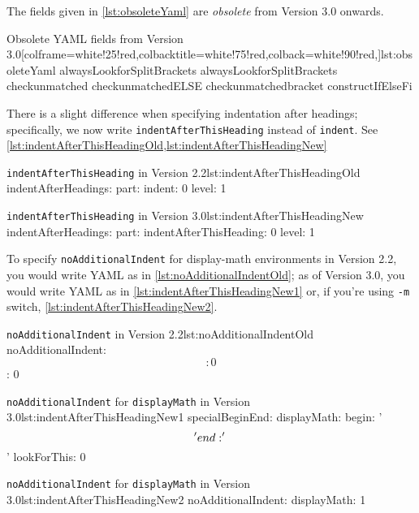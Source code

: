 	 The fields given in \cref{lst:obsoleteYaml} are \emph{obsolete} from Version 3.0
	 onwards.
	 \begin{yaml}[style=yaml-LST,numbers=none]{Obsolete YAML fields from Version 3.0}[colframe=white!25!red,colbacktitle=white!75!red,colback=white!90!red,]{lst:obsoleteYaml}
alwaysLookforSplitBrackets
alwaysLookforSplitBrackets
checkunmatched
checkunmatchedELSE
checkunmatchedbracket
constructIfElseFi
\end{yaml}

	 There is a slight difference when specifying indentation after headings; specifically,
	 we now write \texttt{indentAfterThisHeading} instead of \texttt{indent}. See \cref{lst:indentAfterThisHeadingOld,lst:indentAfterThisHeadingNew}

	 \begin{minipage}{.45\textwidth}
		 \begin{yaml}[style=yaml-LST,numbers=none]{\texttt{indentAfterThisHeading} in Version 2.2}{lst:indentAfterThisHeadingOld}
indentAfterHeadings:
    part:
       indent: 0
       level: 1
\end{yaml}
	 \end{minipage}%
	 \hfill
	 \begin{minipage}{.45\textwidth}
		 \begin{yaml}[style=yaml-LST,numbers=none]{\texttt{indentAfterThisHeading} in Version 3.0}{lst:indentAfterThisHeadingNew}
indentAfterHeadings:
    part:
       indentAfterThisHeading: 0
       level: 1
\end{yaml}
	 \end{minipage}%

	 To specify \texttt{noAdditionalIndent} for display-math environments in Version 2.2, you would write YAML
	 as in \cref{lst:noAdditionalIndentOld}; as of Version 3.0, you would write YAML as in \cref{lst:indentAfterThisHeadingNew1}
	 or, if you're using \texttt{-m} switch, \cref{lst:indentAfterThisHeadingNew2}.

	 \begin{minipage}{.45\textwidth}
		 \begin{yaml}[style=yaml-LST,numbers=none]{\texttt{noAdditionalIndent} in Version 2.2}{lst:noAdditionalIndentOld}
noAdditionalIndent:
    \[: 0
    \]: 0
\end{yaml}
	 \end{minipage}%
	 \hfill
	 \begin{minipage}{.45\textwidth}
		 \begin{yaml}[style=yaml-LST,numbers=none]{\texttt{noAdditionalIndent} for \texttt{displayMath} in Version 3.0}{lst:indentAfterThisHeadingNew1}
specialBeginEnd:
    displayMath:
        begin: '\\\['
        end: '\\\]'
        lookForThis: 0
\end{yaml}

		 \begin{yaml}[style=yaml-LST,numbers=none]{\texttt{noAdditionalIndent} for \texttt{displayMath}  in Version 3.0}{lst:indentAfterThisHeadingNew2}
noAdditionalIndent:
    displayMath: 1
\end{yaml}
	 \end{minipage}%
